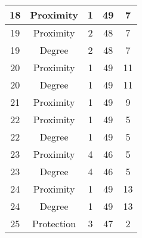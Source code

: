 \documentclass[results.tex]{subfiles}
\begin{document}
\begin{center}
\begin{tabular}{| c || c | c | c | c |}
            \hline
            18                      & Proximity                    & 1                      & 49                      & 7                    \\
            \hline
            19                      & Proximity                    & 2                      & 48                      & 7                    \\
            \hline
            19                      & Degree                       & 2                      & 48                      & 7                    \\
            \hline
            20                      & Proximity                    & 1                      & 49                      & 11                   \\
            \hline
            20                      & Degree                       & 1                      & 49                      & 11                   \\
            \hline
            21                      & Proximity                    & 1                      & 49                      & 9                    \\
            \hline
            22                      & Proximity                    & 1                      & 49                      & 5                    \\
            \hline
            22                      & Degree                       & 1                      & 49                      & 5                    \\
            \hline
            23                      & Proximity                    & 4                      & 46                      & 5                    \\
            \hline
            23                      & Degree                       & 4                      & 46                      & 5                    \\
            \hline
            24                      & Proximity                    & 1                      & 49                      & 13                   \\
            \hline
            24                      & Degree                       & 1                      & 49                      & 13                   \\
            \hline
            25                      & Protection                   & 3                      & 47                      & 2                    \\

\end{tabular}
\end{center}
\end{document}
